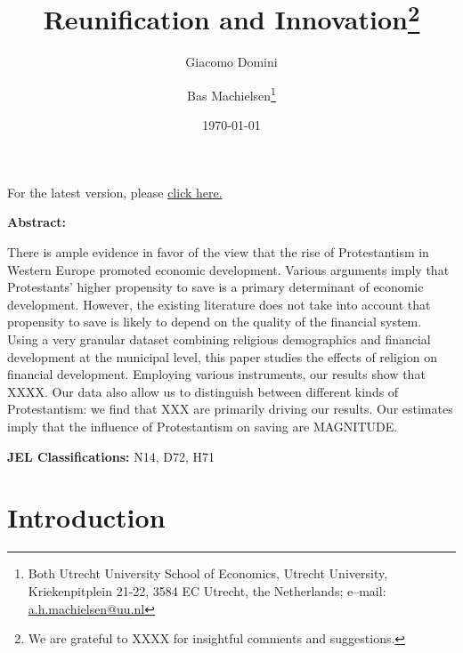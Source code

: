 

\title{Reunification and Innovation\footnote{We are grateful to XXXX for insightful comments and suggestions.}}
\author{Giacomo Domini \and Bas Machielsen\footnote{Both Utrecht University School of Economics, Utrecht University, Kriekenpitplein 21-22, 3584 EC Utrecht, the Netherlands; e--mail: \href{mailto:a.h.machielsen@uu.nl}{a.h.machielsen@uu.nl}}}
\date{\today}



\maketitle

\begin{center}
    For the latest version, please \href{http://link.com/paper.pdf}{click here.}
\end{center}

\begin{center} \textbf{Abstract:} \end{center}

\noindent There is ample evidence in favor of the view that the rise of Protestantism in Western Europe promoted economic development. Various arguments imply that Protestants' higher propensity to save is a primary determinant of economic development. However, the existing literature does not take into account that propensity to save is likely to depend on the quality of the financial system. Using a very granular dataset combining religious demographics and financial development at the municipal level, this paper studies the effects of religion on financial development. Employing various instruments, our results show that XXXX. Our data also allow us to distinguish between different kinds of Protestantism: we find that XXX are primarily driving our results. Our estimates imply that the influence of Protestantism on saving are MAGNITUDE.

\textbf{JEL Classifications:} N14, D72, H71

\clearpage

\section{Introduction}




